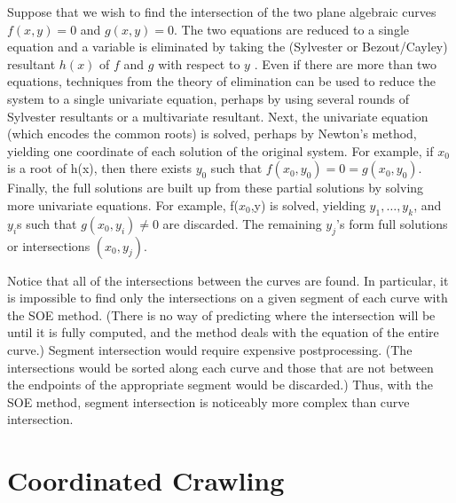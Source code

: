 
\begin{example}
Suppose that we wish to find the intersection of the two plane algebraic curves 
$f(x,y)=0$ and $g(x,y)=0$.
The two equations are reduced to a single equation and a variable is eliminated
by taking the (Sylvester or Bezout/Cayley) resultant $h(x)$ of $f$ and $g$ 
with respect to $y$ \cite{SAG84,VW,W50}.
Even if there are more than two equations, techniques from the theory of elimination
can be used to reduce the system to a single univariate equation, perhaps by using several
rounds of Sylvester resultants or a multivariate resultant.
Next, the univariate equation (which encodes the common roots) is solved, 
perhaps by Newton's method, yielding one coordinate of each solution of the original 
system.
For example, if $x_{0}$ is a root of h(x),
then there exists $y_{0}$ such that $f(x_{0},y_{0})=0=g(x_{0},y_{0})$.
Finally, the full solutions are built up from these partial solutions
by solving more univariate equations.
For example, f($x_{0}$,y) is solved, yielding $y_{1},\ldots,y_{k}$,
and $y_{i}$s such that $g(x_{0},y_{i}) \neq 0$ are discarded.
The remaining $y_{j}$'s form full solutions or intersections $(x_{0},y_{j})$.
\end{example}

Notice that all of the intersections between the curves are found.
In particular, it is impossible to find only the intersections on a given segment of each curve 
with the SOE method.
(There is no way of predicting where the intersection will be until it is fully computed, and
the method deals with the equation of the entire curve.)
Segment intersection would require expensive postprocessing. 
(The intersections would be sorted along each curve and those that are not between the endpoints
of the appropriate segment would be discarded.)
Thus, with the SOE method, segment intersection is noticeably more complex than curve
intersection.

\section{Coordinated Crawling}
\label{sec-coor}

